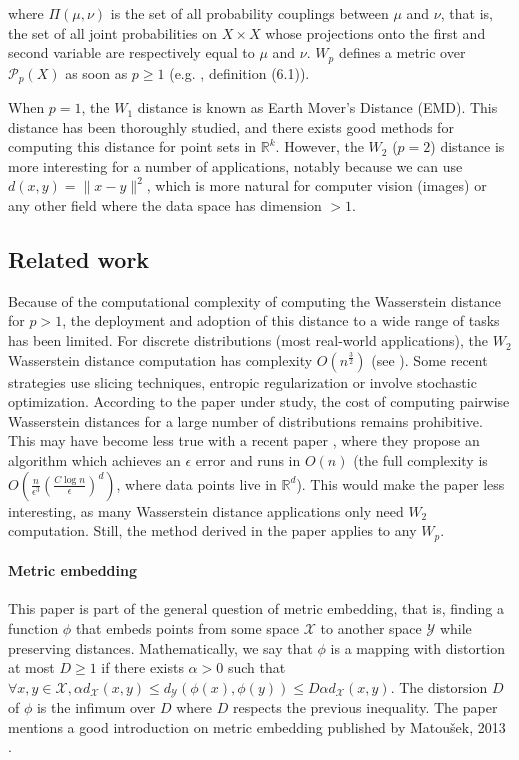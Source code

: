 \documentclass{article}
\begin{document}
where $\Pi(\mu, \nu)$ is the set of all probability couplings between $\mu$ and $\nu$, that is, the set of all joint probabilities on $X \times X$ whose projections onto the first and second variable are respectively equal to $\mu$ and $\nu$. $W_p$ defines a metric over $\mathcal{P}_p(X)$ as soon as $p\geq 1$ (e.g. \cite{villani2008optimal}, definition (6.1)).

When $p=1$, the $W_1$ distance is known as Earth Mover's Distance (EMD). This distance has been thoroughly studied, and there exists good methods for computing this distance for point sets in $\mathbb{R}^k$. However, the $W_2$ ($p=2$) distance is more interesting for a number of applications, notably because we can use $d(x, y) = \| x-y \|^2$, which is more natural for computer vision (images) or any other field where the data space has dimension $>1$.

\subsection{Related work}

Because of the computational complexity of computing the Wasserstein distance for $p>1$, the deployment and adoption of this distance to a wide range of tasks has been limited. For discrete distributions (most real-world applications), the $W_2$ Wasserstein distance computation has complexity $O(n^{\frac{3}{2}})$ (see \cite{agarwal2014approximation}). Some recent strategies use slicing techniques, entropic regularization or involve stochastic optimization. According to the paper under study, the cost of computing pairwise Wasserstein distances for a large number of distributions remains prohibitive. This may have become less true with a recent paper \cite{altschuler2018approximating}, where they propose an algorithm which achieves an $\epsilon$ error and runs in $O(n)$ (the full complexity is $O(\frac{n}{\epsilon^3} (\frac{C \log n}{\epsilon})^d)$, where data points live in $\mathbb{R}^d$). This would make the paper less interesting, as many Wasserstein distance applications only need $W_2$ computation. Still, the method derived in the paper applies to any $W_p$.

\paragraph{Metric embedding} This paper is part of the general question of metric embedding, that is, finding a function $\phi$ that embeds points from some space $\mathcal{X}$ to another space $\mathcal{Y}$ while preserving distances. Mathematically, we say that $\phi$ is a mapping with distortion at most $D \geq 1$ if there exists $\alpha > 0$ such that $\forall x, y \in \mathcal{X}, \alpha d_{\mathcal{X}}(x, y) \leq d_{\mathcal{Y}}(\phi(x), \phi(y)) \leq D \alpha d_{\mathcal{X}}(x, y)$. The distorsion $D$ of $\phi$ is the infimum over $D$ where $D$ respects the previous inequality. The paper mentions a good introduction on metric embedding published by Matoušek, 2013 \cite{matouvsek2013lecture}.
\end{document}
